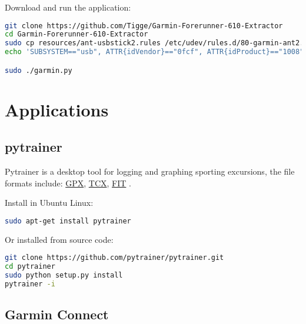 \documentclass[letter,12pt,onecolumn]{article}
\newcommand{\cnt}[3]{{#1}{#2}{#3}}
\renewcommand{\cnt}[3]{#2}
\renewcommand{\cnt}[3]{#3}
\renewcommand{\cnt}[3]{#1}
\begin{document}
\cnt{Download and run the application:}{软件使用：}{軟體使用：}
\begin{lstlisting}[language=bash]
git clone https://github.com/Tigge/Garmin-Forerunner-610-Extractor
cd Garmin-Forerunner-610-Extractor
sudo cp resources/ant-usbstick2.rules /etc/udev/rules.d/80-garmin-ant2.rules
echo 'SUBSYSTEM=="usb", ATTR{idVendor}=="0fcf", ATTR{idProduct}=="1008", MODE="0666", SYMLINK+="ttyANT", ACTION=="add", RUN+="/sbin/modprobe usbserial vendor=0x0fcf product=0x1008"' > /etc/udev/rules.d/80-garmin-ant2.rules

sudo ./garmin.py
\end{lstlisting}


\section{\cnt{Applications}{应用程序}{應用程式}}

\subsection{pytrainer}

\cnt{Pytrainer \cite{pytrainer} is a desktop tool for logging and graphing sporting excursions, the file formats include:}{Pytrainer \cite{pytrainer} 是一个日志图形体育锻炼程序，支持的文件格式包括：}{Pytrainer \cite{pytrainer} 是一個日志圖形體育鍛煉程序，支持的文件格式包括：}
\href{http://www.topografix.com/gpx.asp}{GPX},
\href{http://developer.garmin.com/schemas/tcx/v2/}{TCX},
\href{http://www.thisisant.com/resources/fit}{FIT}
.

\cnt{Install in Ubuntu Linux:}{在 Ubuntu 下可以直接安装:}{在 Ubuntu 下可以直接安裝:}
\begin{lstlisting}[language=bash]
sudo apt-get install pytrainer
\end{lstlisting}

\cnt{Or installed from source code:}{或者通过源代码安装：}{或者通過源代碼安裝：}
\begin{lstlisting}[language=bash]
git clone https://github.com/pytrainer/pytrainer.git
cd pytrainer
sudo python setup.py install
pytrainer -i
\end{lstlisting}

\subsection{Garmin Connect}
\end{document}
